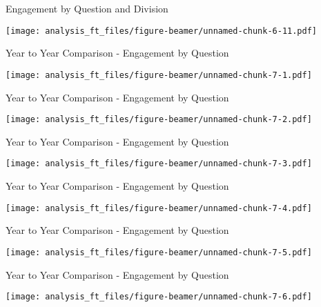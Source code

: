\documentclass[handout]{beamer}
\begin{document}
\begin{frame}{Engagement by Question and Division}
\protect\hypertarget{engagement-by-question-and-division-10}{}

\texttt{[image: analysis\_ft\_files/figure-beamer/unnamed-chunk-6-11.pdf]}

\end{frame}

\begin{frame}{Year to Year Comparison - Engagement by Question}
\protect\hypertarget{year-to-year-comparison---engagement-by-question}{}

\texttt{[image: analysis\_ft\_files/figure-beamer/unnamed-chunk-7-1.pdf]}

\end{frame}

\begin{frame}{Year to Year Comparison - Engagement by Question}
\protect\hypertarget{year-to-year-comparison---engagement-by-question-1}{}

\texttt{[image: analysis\_ft\_files/figure-beamer/unnamed-chunk-7-2.pdf]}

\end{frame}

\begin{frame}{Year to Year Comparison - Engagement by Question}
\protect\hypertarget{year-to-year-comparison---engagement-by-question-2}{}

\texttt{[image: analysis\_ft\_files/figure-beamer/unnamed-chunk-7-3.pdf]}

\end{frame}

\begin{frame}{Year to Year Comparison - Engagement by Question}
\protect\hypertarget{year-to-year-comparison---engagement-by-question-3}{}

\texttt{[image: analysis\_ft\_files/figure-beamer/unnamed-chunk-7-4.pdf]}

\end{frame}

\begin{frame}{Year to Year Comparison - Engagement by Question}
\protect\hypertarget{year-to-year-comparison---engagement-by-question-4}{}

\texttt{[image: analysis\_ft\_files/figure-beamer/unnamed-chunk-7-5.pdf]}

\end{frame}

\begin{frame}{Year to Year Comparison - Engagement by Question}
\protect\hypertarget{year-to-year-comparison---engagement-by-question-5}{}

\texttt{[image: analysis\_ft\_files/figure-beamer/unnamed-chunk-7-6.pdf]}

\end{frame}
\end{document}
